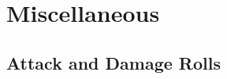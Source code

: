\documentclass[letterpaper,openany,oneside,twocolumn]{book}
\begin{document}
%    
%
%    
%    
%    
%	
%    

\vfill\eject
\section*{Miscellaneous}
\subsection*{Attack and Damage Rolls}
\end{document}
